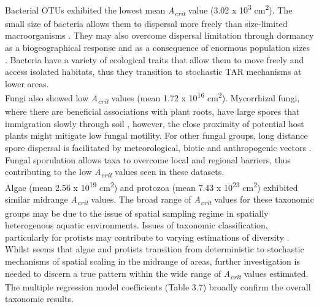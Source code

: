 \noindent Bacterial OTUs exhibited the lowest mean \textit{A\textsubscript{crit}} value (3.02 x 10\textsuperscript{3} cm\textsuperscript{2}). The small size of bacteria allows them to dispersal more freely than size-limited macroorganisms \cite{martiny2006microbial}. They may also overcome dispersal limitation through dormancy as a biogeographical response and as a consequence of enormous population sizes \cite{LoceyKennethJ2010Stbw} \cite{fenchel2004ubiquity}. Bacteria have a variety of ecological traits that allow them to move freely and access isolated habitats, thus they transition to stochastic TAR mechanisms at lower areas. \\
 
\noindent Fungi also showed low \textit{A\textsubscript{crit}} values (mean 1.72 x 10\textsuperscript{16} cm\textsuperscript{2}). Mycorrhizal fungi, where there are beneficial associations with plant roots, have large spores that immigration slowly through soil \cite{bueno2019arbuscular}, however, the close proximity of potential host plants might mitigate low fungal motility. For other fungal groups, long distance spore dispersal is facilitated by meteorological, biotic and anthropogenic vectors \cite{golan2017long}. Fungal sporulation allows taxa to overcome local and regional barriers, thus contributing to the low \textit{A\textsubscript{crit}} values seen in these datasets. \\

\noindent Algae (mean 2.56 x 10\textsuperscript{19} cm\textsuperscript{2}) and protozoa (mean 7.43 x 10\textsuperscript{23} cm\textsuperscript{2}) exhibited similar midrange \textit{A\textsubscript{crit}} values. The broad range of \textit{A\textsubscript{crit}} values for these taxonomic groups may be due to the issue of spatial sampling regime in spatially heterogenous aquatic environments. Issues of taxonomic classification, particularly for protists may contribute to varying estimations of diversity \cite{foissner2006biogeography}. Whilst seems that algae and protists transition from deterministic to stochastic mechanisms of spatial scaling in the midrange of areas, further investigation is needed to discern a true pattern within the wide range of  \textit{A\textsubscript{crit}} values estimated. The multiple regression model coefficients (Table 3.7) broadly confirm the overall taxonomic results. \\

